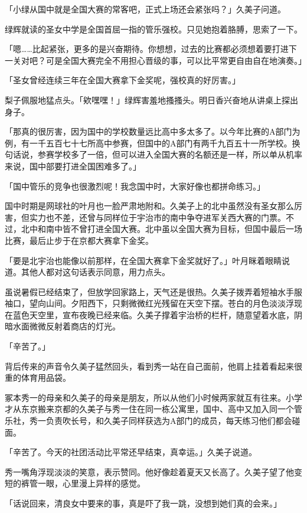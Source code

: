 \documentclass[UTF8]{ctexart}
\begin{document}
    「小绿从国中就是全国大赛的常客吧，正式上场还会紧张吗？」久美子问道。 

    绿辉就读的圣女中学是全国首屈一指的管乐强校。只见她抱着胳膊，思索了一下。 

    「嗯……比起紧张，更多的是兴奋期待。你想想，过去的比赛都必须想着要打进下一关对吧？可是全国大赛完全不用担心晋级的事，可以比平常更自由自在地演奏。」 

    「圣女曾经连续三年在全国大赛拿下金奖呢，强校真的好厉害。」 

    梨子佩服地猛点头。「欸嘿嘿！」绿辉害羞地搔搔头。明日香兴奋地从讲桌上探出身子。 

    「那真的很厉害，因为国中的学校数量远比高中多太多了。以今年比赛的A部门为例，有一千五百七十七所高中参赛，但国中的A部门有两千九百五十一所学校。换句话说，参赛学校多了一倍，但可以进入全国大赛的名额还是一样，所以单从机率来说，国中部要打进全国困难多了。」 

    「国中管乐的竞争也很激烈呢！我念国中时，大家好像也都拼命练习。」 

    国中时期是网球社的叶月也一脸严肃地附和。久美子上的北中虽然没有圣女那么厉害，但实力也不差，还曾与同样位于宇治市的南中争夺进军关西大赛的门票。不过，北中和南中皆不曾打进全国大赛。北中虽以全国大赛为目标，但国中最后一场比赛，最后止步于在京都大赛拿下金奖。 

    「要是北宇治也能像以前那样，在全国大赛拿下金奖就好了。」叶月眯着眼睛说道。其他人都对这句话表示同意，用力点头。 

    虽说暑假已经结束了，但放学回家路上，天气还是很热。久美子拨弄着短袖水手服袖口，望向山间。夕阳西下，只剩微微红光残留在天空下摆。苍白的月色淡淡浮现在蓝色天空里，宣布夜晚已经来临。久美子撑着宇治桥的栏杆，随意望着水底，阴暗水面微微反射着商店的灯光。 

    「辛苦了。」 

    背后传来的声音令久美子猛然回头，看到秀一站在自己面前，他肩上挂着看起来很重的体育用品袋。 

    冢本秀一的母亲和久美子的母亲是朋友，所以从他们小时候两家就互有往来。小学才从东京搬来京都的久美子与秀一住在同一栋公寓里，国中、高中又加入同一个管乐社，秀一负责吹长号，和久美子同样获选为A部门的成员，每天练习他们都会碰面。 

    「辛苦了。今天的社团活动比平常还早结束，真幸运。」久美子说道。 

    秀一嘴角浮现淡淡的笑意，表示赞同。他好像趁着夏天又长高了。久美子望了他变短的裤管一眼，心里漫上异样的感觉。 

    「话说回来，清良女中要来的事，真是吓了我一跳，没想到她们真的会来。」 
\end{document}
